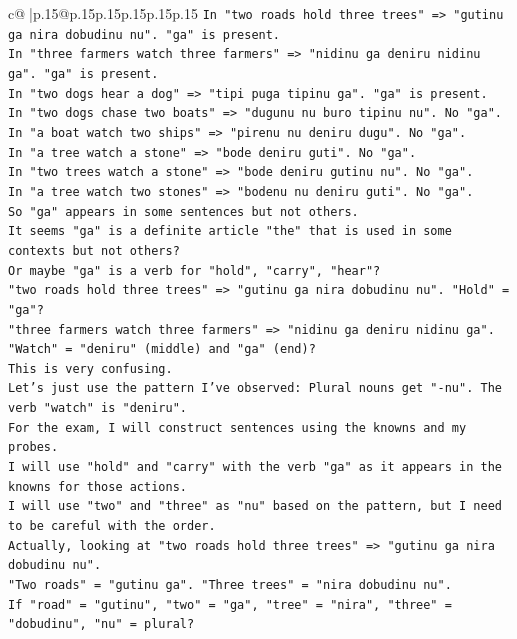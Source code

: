 \documentclass{article}
\begin{document}
{\begin{supertabular}{c@{$\;$}|p{.15\linewidth}@{}p{.15\linewidth}p{.15\linewidth}p{.15\linewidth}p{.15\linewidth}p{.15\linewidth}}
{{{\texttt{In "two roads hold three trees" => "gutinu ga nira dobudinu nu". "ga" is present.} \\
\texttt{In "three farmers watch three farmers" => "nidinu ga deniru nidinu ga". "ga" is present.} \\
\texttt{In "two dogs hear a dog" => "tipi puga tipinu ga". "ga" is present.} \\
\texttt{In "two dogs chase two boats" => "dugunu nu buro tipinu nu". No "ga".} \\
\texttt{In "a boat watch two ships" => "pirenu nu deniru dugu". No "ga".} \\
\texttt{In "a tree watch a stone" => "bode deniru guti". No "ga".} \\
\texttt{In "two trees watch a stone" => "bode deniru gutinu nu". No "ga".} \\
\texttt{In "a tree watch two stones" => "bodenu nu deniru guti". No "ga".} \\
\texttt{So "ga" appears in some sentences but not others.} \\
\texttt{It seems "ga" is a definite article "the" that is used in some contexts but not others?} \\
\texttt{Or maybe "ga" is a verb for "hold", "carry", "hear"?} \\
\texttt{"two roads hold three trees" => "gutinu ga nira dobudinu nu". "Hold" = "ga"?} \\
\texttt{"three farmers watch three farmers" => "nidinu ga deniru nidinu ga". "Watch" = "deniru" (middle) and "ga" (end)?} \\
\texttt{This is very confusing.} \\
\texttt{Let's just use the pattern I've observed: Plural nouns get "{-}nu". The verb "watch" is "deniru".} \\
\texttt{For the exam, I will construct sentences using the knowns and my probes.} \\
\texttt{I will use "hold" and "carry" with the verb "ga" as it appears in the knowns for those actions.} \\
\texttt{I will use "two" and "three" as "nu" based on the pattern, but I need to be careful with the order.} \\
\texttt{Actually, looking at "two roads hold three trees" => "gutinu ga nira dobudinu nu".} \\
\texttt{"Two roads" = "gutinu ga". "Three trees" = "nira dobudinu nu".} \\
\texttt{If "road" = "gutinu", "two" = "ga", "tree" = "nira", "three" = "dobudinu", "nu" = plural?} \\
}}}
\end{supertabular}}
\end{document}
